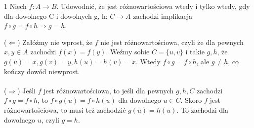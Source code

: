 \documentclass{../note}
\begin{document}
\begin{zadanie}{1}
Niech $f:A \rightarrow B$. Udowodnić, że jest różnowartościowa wtedy i tylko wtedy, gdy
dla dowolnego C i dowolnych g, h: $C \rightarrow A$ zachodzi implikacja
$f \circ g = f \circ h \Rightarrow g=h.$
\end{zadanie}
\begin{rozwiazanie}
($\Leftarrow$)
Załóżmy nie wprost, że $f$ nie jest różnowartościowa, czyli że dla pewnych $x, y \in A$ zachodzi $f(x) = f(y)$. Weźmy sobie $C = \{u, v\}$ i takie $g, h$, że $g(u) = x, g(v) = y, h(u) = h(v) = x$. Wtedy $f \circ g = f \circ h$, ale $g \neq h$, co kończy dowód niewprost.\\\\
($\Rightarrow$)
Jeśli $f$ jest różnowartościowa, to jeśli dla pewnych $g, h, C$ zachodzi $f \circ g = f \circ h$, to $f \circ g(u) = f \circ h(u)$ dla dowolnego $u \in C$. Skoro $f$ jest różnowartościowa, to musi też zachodzić $g(u) = h(u)$. To zachodzi dla dowolnego $u$, czyli $g = h$.
\end{rozwiazanie}
\end{document}
